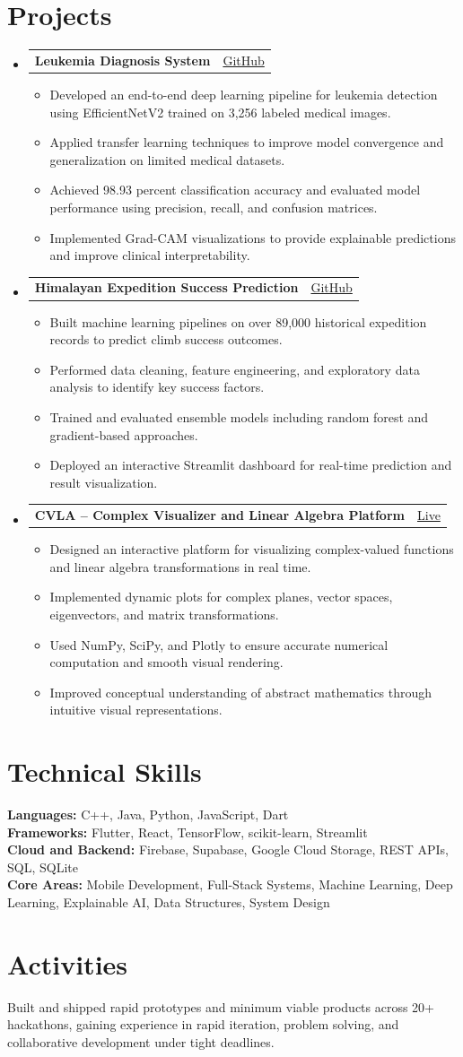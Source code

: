 \documentclass[letterpaper,11pt]{article}
\makeatletter
\newcommand{\resumeItem}[1]{\item \small{#1}}
\newcommand{\resumeItemListStart}{\begin{itemize}[leftmargin=0.15in]}
\newcommand{\resumeItemListEnd}{\end{itemize}\vspace{-6pt}}
\newcommand{\resumeSectionStart}{\begin{itemize}[leftmargin=0in, label={}]}
\newcommand{\resumeSectionEnd}{\end{itemize}}
\newcommand{\resumeProjectHeading}[2]{
  \item
  \begin{tabular*}{\textwidth}{l@{\extracolsep{\fill}}r}
    \textbf{#1} & \small #2 \\
  \end{tabular*}\vspace{-6pt}
}
\makeatother
\begin{document}
\section{Projects}
\resumeSectionStart

\resumeProjectHeading
{Leukemia Diagnosis System}
{\href{https://github.com/divyanshupatel17/Leukemia-Diagnosis-EfficientNetV2-vs-CNNs}{GitHub}}
\resumeItemListStart
\resumeItem{Developed an end-to-end deep learning pipeline for leukemia detection using EfficientNetV2 trained on 3,256 labeled medical images.}
\resumeItem{Applied transfer learning techniques to improve model convergence and generalization on limited medical datasets.}
\resumeItem{Achieved 98.93 percent classification accuracy and evaluated model performance using precision, recall, and confusion matrices.}
\resumeItem{Implemented Grad-CAM visualizations to provide explainable predictions and improve clinical interpretability.}
\resumeItemListEnd

\resumeProjectHeading
{Himalayan Expedition Success Prediction}
{\href{https://github.com/divyanshupatel17/himalayan-expedition-success-prediction}{GitHub}}
\resumeItemListStart
\resumeItem{Built machine learning pipelines on over 89,000 historical expedition records to predict climb success outcomes.}
\resumeItem{Performed data cleaning, feature engineering, and exploratory data analysis to identify key success factors.}
\resumeItem{Trained and evaluated ensemble models including random forest and gradient-based approaches.}
\resumeItem{Deployed an interactive Streamlit dashboard for real-time prediction and result visualization.}
\resumeItemListEnd

\resumeProjectHeading
{CVLA – Complex Visualizer and Linear Algebra Platform}
{\href{https://cvla-project.streamlit.app}{Live}}
\resumeItemListStart
\resumeItem{Designed an interactive platform for visualizing complex-valued functions and linear algebra transformations in real time.}
\resumeItem{Implemented dynamic plots for complex planes, vector spaces, eigenvectors, and matrix transformations.}
\resumeItem{Used NumPy, SciPy, and Plotly to ensure accurate numerical computation and smooth visual rendering.}
\resumeItem{Improved conceptual understanding of abstract mathematics through intuitive visual representations.}
\resumeItemListEnd

\resumeSectionEnd

\section{Technical Skills}
\small{
\textbf{Languages:} C++, Java, Python, JavaScript, Dart \\
\textbf{Frameworks:} Flutter, React, TensorFlow, scikit-learn, Streamlit \\
\textbf{Cloud and Backend:} Firebase, Supabase, Google Cloud Storage, REST APIs, SQL, SQLite \\
\textbf{Core Areas:} Mobile Development, Full-Stack Systems, Machine Learning, Deep Learning, Explainable AI, Data Structures, System Design
}

\section{Activities}
Built and shipped rapid prototypes and minimum viable products across 20+ hackathons, gaining experience in rapid iteration, problem solving, and collaborative development under tight deadlines.
\end{document}
